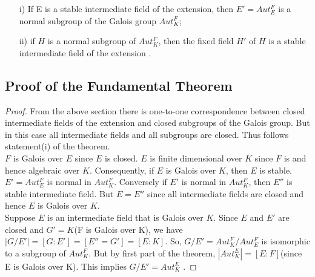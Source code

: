 \begin{lemma}
  \begin{enumerate}
  \item[i)] If E is a stable intermediate field of the extension, then \(E'=Aut_E^F\) is a normal subgroup of the Galois group \(Aut_K^F\);
  \item[ii)] if \(H\) is a normal subgroup of \(Aut_K^F\), then the fixed field \(H'\) of \(H\) is a stable intermediate field of the extension
    \cite{hunger}.
  \end{enumerate}
\end{lemma}

\subsection{Proof of the Fundamental Theorem}
\begin{proof}
  From the above section there is one-to-one correspondence between closed intermediate fields of the extension and closed subgroups of the Galois group. But in this case all intermediate fields and all subgroups are closed. Thus follows statement(i) of the theorem.\\

  \(F\) is Galois over \(E\) since \(E\) is closed. \(E\) is finite dimensional over \(K\) since \(F\) is and hence algebraic over \(K\). Consequently, if \(E\) is Galois over \(K\), then \(E\) is stable.
  \(E'=Aut_E^F\) is normal in \(Aut_K^F\). Conversely if \(E'\) is normal in \(Aut_K^F\), then \(E''\) is stable intermediate field. But \(E=E''\) since all intermediate fields are closed and hence \(E\) is Galois over \(K\).\\

  Suppose \(E\) is an intermediate field that is Galois over \(K\). Since \(E\) and \(E'\) are closed and \(G'=K\)(F is Galois over K), we have \(|G/E'|=[G:E']=[E''=G']=[E:K]\). So, \(G/E'=Aut_K^F/Aut_E^F\) is isomorphic to a subgroup of \(Aut_K^F\). But by first part of the theorem, \(|Aut_K^E|=[E:F]\)(since E is Galois over K). This implies \(G/E'=Aut_K^E\) \cite{hunger}.
\end{proof}

